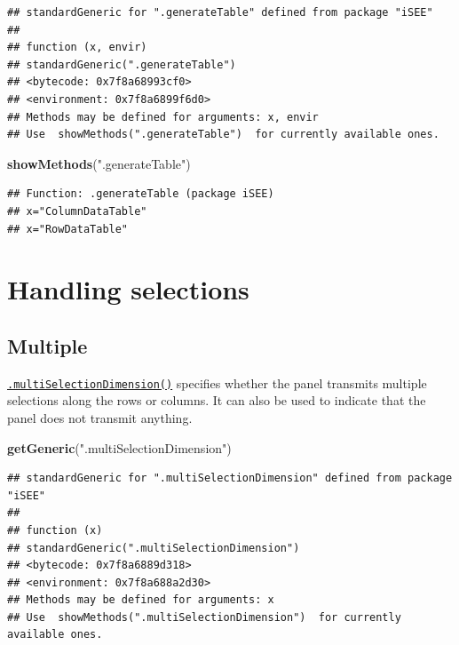 \documentclass[
]{book}
\newenvironment{Shaded}{\begin{snugshade}}{\end{snugshade}}
\newcommand{\KeywordTok}[1]{\textcolor[rgb]{0.13,0.29,0.53}{\textbf{#1}}}
\newcommand{\NormalTok}[1]{#1}
\newcommand{\StringTok}[1]{\textcolor[rgb]{0.31,0.60,0.02}{#1}}
\begin{document}
\begin{verbatim}
## standardGeneric for ".generateTable" defined from package "iSEE"
## 
## function (x, envir) 
## standardGeneric(".generateTable")
## <bytecode: 0x7f8a68993cf0>
## <environment: 0x7f8a6899f6d0>
## Methods may be defined for arguments: x, envir
## Use  showMethods(".generateTable")  for currently available ones.
\end{verbatim}

\begin{Shaded}
\begin{Highlighting}[]
\KeywordTok{showMethods}\NormalTok{(}\StringTok{".generateTable"}\NormalTok{)}
\end{Highlighting}
\end{Shaded}

\begin{verbatim}
## Function: .generateTable (package iSEE)
## x="ColumnDataTable"
## x="RowDataTable"
\end{verbatim}

\hypertarget{handling-selections}{%
\section{Handling selections}\label{handling-selections}}

\hypertarget{multiple}{%
\subsection{Multiple}\label{multiple}}

\href{https://isee.github.io/iSEE/reference/multi-select-generics.html}{\texttt{.multiSelectionDimension()}} specifies whether the panel transmits multiple selections along the rows or columns.
It can also be used to indicate that the panel does not transmit anything.

\begin{Shaded}
\begin{Highlighting}[]
\KeywordTok{getGeneric}\NormalTok{(}\StringTok{".multiSelectionDimension"}\NormalTok{)}
\end{Highlighting}
\end{Shaded}

\begin{verbatim}
## standardGeneric for ".multiSelectionDimension" defined from package "iSEE"
## 
## function (x) 
## standardGeneric(".multiSelectionDimension")
## <bytecode: 0x7f8a6889d318>
## <environment: 0x7f8a688a2d30>
## Methods may be defined for arguments: x
## Use  showMethods(".multiSelectionDimension")  for currently available ones.
\end{verbatim}
\end{document}
